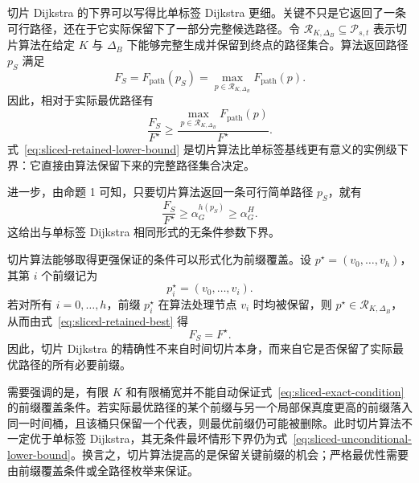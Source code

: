 切片 Dijkstra 的下界可以写得比单标签 Dijkstra 更细。关键不只是它返回了一条可行路径，还在于它实际保留下了一部分完整候选路径。令 $\mathcal{R}_{K,\Delta_B}\subseteq \mathcal{P}_{s,t}$ 表示切片算法在给定 $K$ 与 $\Delta_B$ 下能够完整生成并保留到终点的路径集合。算法返回路径 $p_S$ 满足
\begin{equation}
  F_S
  =
  F_{\mathrm{path}}(p_S)
  =
  \max_{p\in\mathcal{R}_{K,\Delta_B}}
  F_{\mathrm{path}}(p).
  \label{eq:sliced-retained-best}
\end{equation}
因此，相对于实际最优路径有
\begin{equation}
  \frac{F_S}{F^\star}
  \ge
  \frac{
    \max_{p\in\mathcal{R}_{K,\Delta_B}}F_{\mathrm{path}}(p)
  }{
    F^\star
  }.
  \label{eq:sliced-retained-lower-bound}
\end{equation}
式~\eqref{eq:sliced-retained-lower-bound} 是切片算法比单标签基线更有意义的实例级下界：它直接由算法保留下来的完整路径集合决定。

进一步，由命题 1 可知，只要切片算法返回一条可行简单路径 $p_S$，就有
\begin{equation}
  \frac{F_S}{F^\star}
  \ge
  \alpha_G^{h(p_S)}
  \ge
  \alpha_G^H.
  \label{eq:sliced-unconditional-lower-bound}
\end{equation}
这给出与单标签 Dijkstra 相同形式的无条件参数下界。

切片算法能够取得更强保证的条件可以形式化为前缀覆盖。设 $p^\star=(v_0,\ldots,v_h)$，其第 $i$ 个前缀记为
\[
p^\star_i=(v_0,\ldots,v_i).
\]
若对所有 $i=0,\ldots,h$，前缀 $p^\star_i$ 在算法处理节点 $v_i$ 时均被保留，则 $p^\star\in\mathcal{R}_{K,\Delta_B}$，从而由式~\eqref{eq:sliced-retained-best} 得
\begin{equation}
  F_S = F^\star.
  \label{eq:sliced-exact-condition}
\end{equation}
因此，切片 Dijkstra 的精确性不来自时间切片本身，而来自它是否保留了实际最优路径的所有必要前缀。

需要强调的是，有限 $K$ 和有限桶宽并不能自动保证式~\eqref{eq:sliced-exact-condition} 的前缀覆盖条件。若实际最优路径的某个前缀与另一个局部保真度更高的前缀落入同一时间桶，且该桶只保留一个代表，则最优前缀仍可能被删除。此时切片算法不一定优于单标签 Dijkstra，其无条件最坏情形下界仍为式~\eqref{eq:sliced-unconditional-lower-bound}。换言之，切片算法提高的是保留关键前缀的机会；严格最优性需要由前缀覆盖条件或全路径枚举来保证。
